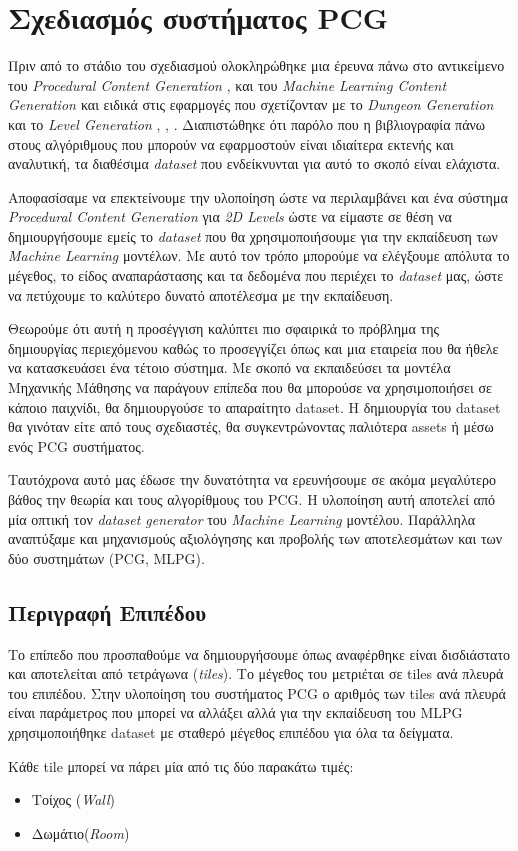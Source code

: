 \section{Σχεδιασμός συστήματος PCG}
Πριν από το στάδιο του σχεδιασμού ολοκληρώθηκε μια έρευνα πάνω στο αντικείμενο του \textit{Procedural Content Generation} \cite{answersetforpcg} \cite{constrainedsearchpcg} \cite{surrogate}, \cite{roguedream} και του  \textit{Machine Learning Content Generation \cite{mlpcg}} και ειδικά στις εφαρμογές που σχετίζονταν με το \textit{Dungeon Generation} και το \textit{Level Generation} \cite{cellular}, \cite{missions}, \cite{platform}. Διαπιστώθηκε ότι παρόλο που η βιβλιογραφία πάνω στους αλγόριθμους που μπορούν να εφαρμοστούν είναι ιδιαίτερα εκτενής και αναλυτική, τα διαθέσιμα \textit{dataset} που ενδείκνυνται για αυτό το σκοπό είναι ελάχιστα.
\par
Αποφασίσαμε να επεκτείνουμε την υλοποίηση ώστε να περιλαμβάνει και ένα σύστημα \textit{Procedural Content Generation} για \textit{2D Levels} ώστε να είμαστε σε θέση να δημιουργήσουμε εμείς το \textit{dataset} που θα χρησιμοποιήσουμε για την εκπαίδευση των \textit{Machine Learning} μοντέλων. Με αυτό τον τρόπο μπορούμε να ελέγξουμε απόλυτα το μέγεθος, το είδος αναπαράστασης και τα δεδομένα που περιέχει το \textit{dataset} μας, ώστε να πετύχουμε το καλύτερο δυνατό αποτέλεσμα με την εκπαίδευση.
\par
Θεωρούμε ότι αυτή η προσέγγιση καλύπτει πιο σφαιρικά το πρόβλημα της δημιουργίας περιεχόμενου καθώς το προσεγγίζει όπως και μια εταιρεία που θα ήθελε να κατασκευάσει ένα τέτοιο σύστημα. Με σκοπό να εκπαιδεύσει τα μοντέλα Μηχανικής Μάθησης να παράγουν επίπεδα που θα μπορούσε να χρησιμοποιήσει σε κάποιο παιχνίδι, θα δημιουργούσε το απαραίτητο dataset. Η δημιουργία του dataset θα γινόταν είτε από τους σχεδιαστές, θα συγκεντρώνοντας παλιότερα assets ή μέσω ενός PCG συστήματος.
\par
Ταυτόχρονα αυτό μας έδωσε την δυνατότητα να ερευνήσουμε σε ακόμα μεγαλύτερο βάθος την θεωρία και τους αλγορίθμους του PCG. Η υλοποίηση αυτή αποτελεί από μία οπτική τον \textit{dataset generator} του \textit{Machine Learning} μοντέλου. Παράλληλα αναπτύξαμε και μηχανισμούς αξιολόγησης και προβολής των αποτελεσμάτων και των δύο συστημάτων (PCG, MLPG).


\subsection{Περιγραφή Επιπέδου}
Το επίπεδο που προσπαθούμε να δημιουργήσουμε όπως αναφέρθηκε είναι δισδιάστατο και αποτελείται από τετράγωνα (\textit{tiles}). Το μέγεθος του μετριέται σε tiles ανά πλευρά του επιπέδου. Στην υλοποίηση του συστήματος PCG ο αριθμός των tiles ανά πλευρά είναι παράμετρος που μπορεί να αλλάξει αλλά για την εκπαίδευση του MLPG χρησιμοποιήθηκε dataset με σταθερό μέγεθος επιπέδου για όλα τα δείγματα.
\par
Κάθε tile μπορεί να πάρει μία από τις δύο παρακάτω τιμές:
\begin{itemize}
\item Τοίχος (\textit{Wall})
\item Δωμάτιο(\textit{Room})
\end{itemize}

